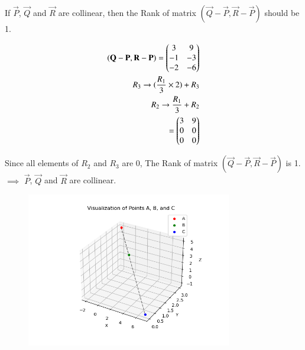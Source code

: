 \documentclass[journal]{IEEEtran}
\begin{document}
If $\vec{P}$, $\vec{Q}$ and $\vec{R}$ are collinear, then the Rank of matrix $(\vec{Q} - \vec{P},\vec{R} - \vec{P})$ should be 1.

\begin{align}
(\mathbf{Q} - \mathbf{P},\mathbf{R} - \mathbf{P}) = \begin{pmatrix}3&9\\-1&-3\\-2&-6\end{pmatrix}  \\ 
R_3 \rightarrow (\frac{R_1}{3}\times2) + R_3  \\
R_2 \rightarrow \frac{R_1}{3} + R_2  \\
= \begin{pmatrix}3&9\\0&0\\0&0\end{pmatrix}  \\
\end{align}

Since all elements of $R_2$ and $R_3$ are 0, The Rank of matrix $(\vec{Q} - \vec{P},\vec{R} - \vec{P})$ is 1.  \\
$\implies$ $\vec{P}$, $\vec{Q}$ and $\vec{R}$ are collinear.

\begin{figure}[H]
    \centering
    \includegraphics[width=0.8\textwidth]{figs/Fig 1.png}
    \caption{}
    \label{fig:Parallelogram}
\end{figure}
\end{document}
